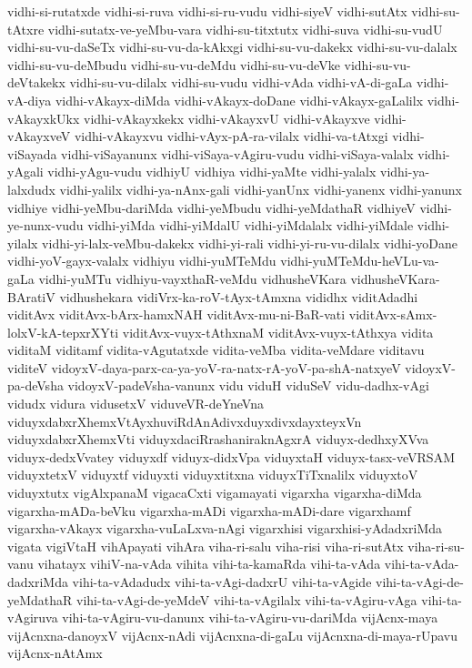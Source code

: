 {vidhi-si-rutatxde
vidhi-si-ruva
vidhi-si-ru-vudu
vidhi-siyeV
vidhi-sutAtx
vidhi-su-tAtxre
vidhi-sutatx-ve-yeMbu-vara
vidhi-su-titxtutx
vidhi-suva
vidhi-su-vudU
vidhi-su-vu-daSeTx
vidhi-su-vu-da-kAkxgi
vidhi-su-vu-dakekx
vidhi-su-vu-dalalx
vidhi-su-vu-deMbudu
vidhi-su-vu-deMdu
vidhi-su-vu-deVke
vidhi-su-vu-deVtakekx
vidhi-su-vu-dilalx
vidhi-su-vudu
vidhi-vAda
vidhi-vA-di-gaLa
vidhi-vA-diya
vidhi-vAkayx-diMda
vidhi-vAkayx-doDane
vidhi-vAkayx-gaLalilx
vidhi-vAkayxkUkx
vidhi-vAkayxkekx
vidhi-vAkayxvU
vidhi-vAkayxve
vidhi-vAkayxveV
vidhi-vAkayxvu
vidhi-vAyx-pA-ra-vilalx
vidhi-va-tAtxgi
vidhi-viSayada
vidhi-viSayanunx
vidhi-viSaya-vAgiru-vudu
vidhi-viSaya-valalx
vidhi-yAgali
vidhi-yAgu-vudu
vidhiyU
vidhiya
vidhi-yaMte
vidhi-yalalx
vidhi-ya-lalxdudx
vidhi-yalilx
vidhi-ya-nAnx-gali
vidhi-yanUnx
vidhi-yanenx
vidhi-yanunx
vidhiye
vidhi-yeMbu-dariMda
vidhi-yeMbudu
vidhi-yeMdathaR
vidhiyeV
vidhi-ye-nunx-vudu
vidhi-yiMda
vidhi-yiMdalU
vidhi-yiMdalalx
vidhi-yiMdale
vidhi-yilalx
vidhi-yi-lalx-veMbu-dakekx
vidhi-yi-rali
vidhi-yi-ru-vu-dilalx
vidhi-yoDane
vidhi-yoV-gayx-valalx
vidhiyu
vidhi-yuMTeMdu
vidhi-yuMTeMdu-heVLu-va-gaLa
vidhi-yuMTu
vidhiyu-vayxthaR-veMdu
vidhusheVKara
vidhusheVKara-BAratiV
vidhushekara
vidiVrx-ka-roV-tAyx-tAmxna
vididhx
viditAdadhi
viditAvx
viditAvx-bArx-hamxNAH
viditAvx-mu-ni-BaR-vati
viditAvx-sAmx-lolxV-kA-tepxrXYti
viditAvx-vuyx-tAthxnaM
viditAvx-vuyx-tAthxya
vidita
viditaM
viditamf
vidita-vAgutatxde
vidita-veMba
vidita-veMdare
viditavu
viditeV
vidoyxV-daya-parx-ca-ya-yoV-ra-natx-rA-yoV-pa-shA-natxyeV
vidoyxV-pa-deVsha
vidoyxV-padeVsha-vanunx
vidu
viduH
viduSeV
vidu-dadhx-vAgi
vidudx
vidura
vidusetxV
viduveVR-deYneVna
viduyxdabxrXhemxVtAyxhuviRdAnAdivxduyxdivxdayxteyxVn
viduyxdabxrXhemxVti
viduyxdaciRrashaniraknAgxrA
viduyx-dedhxyXVva
viduyx-dedxVvatey
viduyxdf
viduyx-didxVpa
viduyxtaH
viduyx-tasx-veVRSAM
viduyxtetxV
viduyxtf
viduyxti
viduyxtitxna
viduyxTiTxnalilx
viduyxtoV
viduyxtutx
vigAlxpanaM
vigacaCxti
vigamayati
vigarxha
vigarxha-diMda
vigarxha-mADa-beVku
vigarxha-mADi
vigarxha-mADi-dare
vigarxhamf
vigarxha-vAkayx
vigarxha-vuLaLxva-nAgi
vigarxhisi
vigarxhisi-yAdadxriMda
vigata
vigiVtaH
vihApayati
vihAra
viha-ri-salu
viha-risi
viha-ri-sutAtx
viha-ri-su-vanu
vihatayx
vihiV-na-vAda
vihita
vihi-ta-kamaRda
vihi-ta-vAda
vihi-ta-vAda-dadxriMda
vihi-ta-vAdadudx
vihi-ta-vAgi-dadxrU
vihi-ta-vAgide
vihi-ta-vAgi-de-yeMdathaR
vihi-ta-vAgi-de-yeMdeV
vihi-ta-vAgilalx
vihi-ta-vAgiru-vAga
vihi-ta-vAgiruva
vihi-ta-vAgiru-vu-danunx
vihi-ta-vAgiru-vu-dariMda
vijAcnx-maya
vijAcnxna-danoyxV
vijAcnx-nAdi
vijAcnxna-di-gaLu
vijAcnxna-di-maya-rUpavu
vijAcnx-nAtAmx
}
